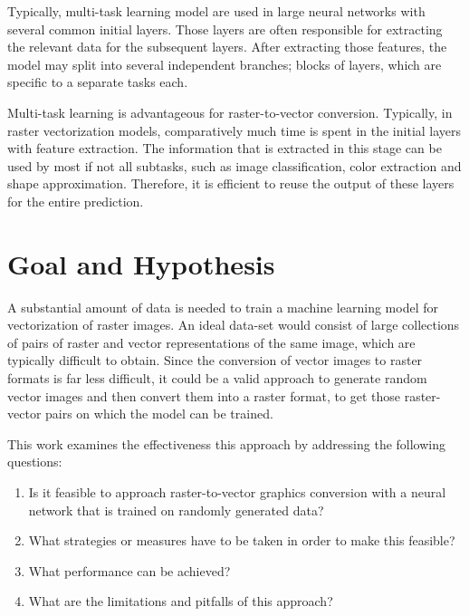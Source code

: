 \documentclass[12pt, a4paper, titlepage]{report}
\begin{document}
Typically, multi-task learning model are used in large neural networks with several common initial layers. Those layers are often responsible for extracting the relevant data for the subsequent layers. After extracting those features, the model may split into several independent branches; blocks of layers, which are specific to a separate tasks each.

Multi-task learning is advantageous for raster-to-vector conversion. Typically, in raster vectorization models, comparatively much time is spent in the initial layers with feature extraction. The information that is extracted in this stage can be used by most if not all subtasks, such as image classification, color extraction and shape approximation. Therefore, it is efficient to reuse the output of these layers for the entire prediction.




\chapter{Goal and Hypothesis}

A substantial amount of data is needed to train a machine learning model for vectorization of raster images. An ideal data-set would consist of large collections of pairs of raster and vector representations of the same image, which are typically difficult to obtain. Since the conversion of vector images to raster formats is far less difficult, it could be a valid approach to generate random vector images and then convert them into a raster format, to get those raster-vector pairs on which the model can be trained.

\vspace{0.2cm}
This work examines the effectiveness this approach by addressing the following questions:

\begin{enumerate}[label=\Roman*.]
   \item Is it feasible to approach raster-to-vector graphics conversion with a neural network that is trained on randomly generated data?
   \item What strategies or measures have to be taken in order to make this feasible?
   \item What performance can be achieved?
   \item What are the limitations and pitfalls of this approach?
\end{enumerate}
\end{document}
